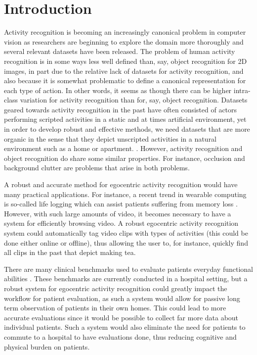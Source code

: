 \documentclass[10pt,twocolumn,letterpaper]{article}
\begin{document}
\section{Introduction}
	Activity recognition is becoming an increasingly canonical problem in
	computer vision as researchers are beginning to explore the domain more
	thoroughly and several relevant datasets have been released. The problem 
	of human activity recognition is in some ways less well defined
	than, say, object recognition for 2D images, in part due to the relative
	lack of datasets for activity recognition, and also because it is somewhat
	problematic to define a canonical representation for each type of action.
	In other words, it seems as though there can be higher intra-class
	variation for activity recognition than for, say, object recognition. 
	Datasets geared towards activity recognition in the past have often
	consisted of actors performing scripted activities in a static and at
	times artificial environment, yet in order to develop robust and effective
	methods, we need datasets that are more organic in the sense that they
	depict unscripted activities in a natural environment such as a home or
	apartment.
	\cite{Ramanan12}. 
	However, activity recognition and object recognition do share some
	similar properties. For instance, occlusion and background clutter are
	problems that arise in both problems.

	A robust and accurate method for egocentric activity recognition would have 
	many practical applications. For instance,
	a recent trend in wearable computing is so-called life logging which can
	assist patients suffering from memory loss \cite{Sellen07}. However, with
	such large amounts of video, it becomes necessary to have a system for
	efficiently browsing video. A robust egocentric activity recognition
	system could automatically tag video clips with types of activities (this
	could be done either online or offline), thus allowing the user to, for
	instance, quickly find all clips in the past that depict making tea.

	There are many clinical benchmarks used to evaluate patients everyday
	functional abilities \cite{Kopp97, Catz97, Itzkovich07}. 
	These benchmarks are currently conducted in a
	hospital setting, but a robust system for egocentric activity recognition
	could greatly impact the workflow for patient evaluation, as such a system
	would allow for passive long term observation of patients in their own
	homes. This could lead to more accurate evaluations since it would be
	possible to collect far more data about individual patients. Such a system
	would also eliminate the need for patients to commute to a hospital to have
	evaluations done, thus reducing cognitive and physical burden on patients.
	
\end{document}

